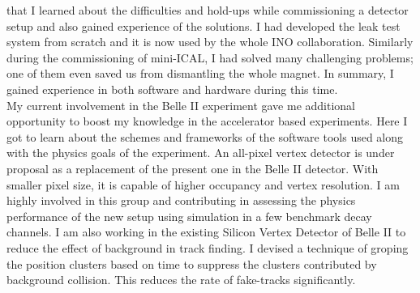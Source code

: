 \documentclass[12pt]{article}
\begin{document}
\begin{justify}
  that I learned about the difficulties and hold-ups while commissioning
  a detector setup and also gained experience of the solutions.
  I had developed the leak test system from scratch and it is now
  used by the whole INO collaboration. Similarly during the
  commissioning of mini-ICAL, I had solved many challenging problems; one of
  them even saved us from dismantling the whole magnet.
  In summary, I gained experience in both software and hardware during this time.\\
  \hspace*{0.6cm}
  My current involvement in the Belle II experiment gave me additional
  opportunity to boost my knowledge in the accelerator based experiments.
  Here I got to learn about the schemes and frameworks of the software tools
  used along with the physics goals of the experiment.
  An all-pixel vertex detector is under proposal as a replacement of
  the present one in the Belle II detector. With smaller pixel size, it is
  capable of higher occupancy and vertex resolution. I am highly involved
  in this group and contributing in assessing the physics performance of the
  new setup using simulation in a few benchmark decay channels.
  I am also working in the existing Silicon Vertex Detector of Belle II to
  reduce the effect of background in track finding. I devised a technique
  of groping the position clusters based on time to suppress the clusters
  contributed by background collision. This reduces the rate of fake-tracks
  significantly.\\

\end{justify}
\end{document}
